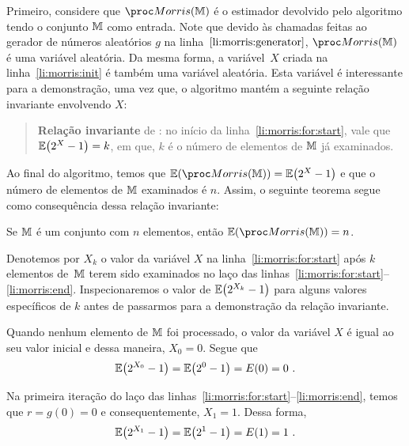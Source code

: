 Primeiro, considere que $\morrisestimator$ é o estimador devolvido pelo algoritmo tendo o conjunto $\mathbb{M}$ como entrada. 
Note que devido às chamadas feitas ao gerador de números aleatórios $g$ na linha~$\ref{li:morris:generator}$, 
$\morrisestimator$ é uma variável aleatória. Da mesma forma, a variável~$X$ criada na linha~\ref{li:morris:init} é 
também uma variável aleatória. Esta variável é interessante para a demonstração, uma vez que, o algoritmo  
mantém a seguinte relação invariante envolvendo $X$:

\begin{quote}
  \textbf{Relação invariante} de : no início da linha~\ref{li:morris:for:start}, vale que 
  $\mathbb{E}\big(2^{X} - 1\big) = k$, em que, $k$ é o número de elementos de $\mathbb{M}$ já examinados. 
\end{quote}

Ao final do algoritmo, temos que $\Ebb(\morrisestimator)=\Ebb\big(2^{X}-1\big)$ e que o número de elementos de $\mathbb{M}$ 
examinados é $n$. Assim, o seguinte teorema segue como consequência dessa relação invariante:

\begin{theorem}
  \label{morris:theorem:expected_value}
  Se $\mathbb{M}$ é um conjunto com $n$ elementos, então $\Ebb(\morrisestimator) = n$.
\end{theorem}

Denotemos por $X_k$ o valor da variável $X$ na linha~\ref{li:morris:for:start} após $k$ elementos de~$\mathbb{M}$ terem sido 
examinados no laço das linhas~\ref{li:morris:for:start}--\ref{li:morris:end}. Inspecionaremos o valor de 
$\mathbb{E}\big(2^{X_k} - 1\big)$ para alguns valores específicos de $k$ antes de passarmos para a demonstração da relação 
invariante.

Quando nenhum elemento de $\mathbb{M}$ foi processado, o valor da variável $X$ é igual ao seu valor inicial e dessa maneira,
$X_0 = 0$. Segue que
\[ \mathbb{E}\big(2^{X_0} - 1\big) = \mathbb{E}\big(2^0 - 1\big) = E(0) = 0 \ .\]

Na primeira iteração do laço das linhas~\ref{li:morris:for:start}--\ref{li:morris:end}, temos que $r = g(0) = 0$ e 
consequentemente, $X_1 = 1$. Dessa forma, 
\[ \mathbb{E}\big(2^{X_1} - 1\big) = \mathbb{E}\big(2^1 - 1\big) = E(1) = 1 \ .\]

